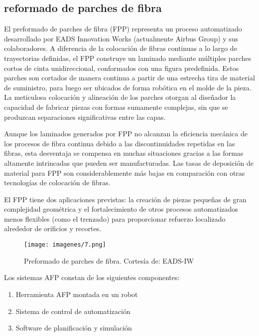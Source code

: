 \begin{enumerate}[label=\arabic*.]
\subsection{reformado de parches de fibra}

El preformado de parches de fibra (FPP) representa un proceso automatizado desarrollado por EADS Innovation Works (actualmente Airbus Group) y sus colaboradores. A diferencia de la colocación de fibras continuas a lo largo de trayectorias definidas, el FPP construye un laminado mediante múltiples parches cortos de cinta unidireccional, conformados con una figura predefinida. Estos parches son cortados de manera continua a partir de una estrecha tira de material de suministro, para luego ser ubicados de forma robótica en el molde de la pieza. La meticulosa colocación y alineación de los parches otorgan al diseñador la capacidad de fabricar piezas con formas sumamente complejas, sin que se produzcan separaciones significativas entre las capas.

Aunque los laminados generados por FPP no alcanzan la eficiencia mecánica de los procesos de fibra continua debido a las discontinuidades repetidas en las fibras, esta desventaja se compensa en muchas situaciones gracias a las formas altamente intrincadas que pueden ser manufacturadas. Las tasas de deposición de material para FPP son considerablemente más bajas en comparación con otras tecnologías de colocación de fibras.

El FPP tiene dos aplicaciones previstas: la creación de piezas pequeñas de gran complejidad geométrica y el fortalecimiento de otros procesos automatizados menos flexibles (como el trenzado) para proporcionar refuerzo localizado alrededor de orificios y recortes.

\begin{figure}[h]
    \centering
    \texttt{[image: imagenes/7.png]}
    \caption{Preformado de parches de fibra. Cortesía de: EADS-IW}
    \label{fig:enter-label}
\end{figure}


Los sistemas AFP constan de los siguientes componentes:

\begin{enumerate}
    \item Herramienta AFP montada en un robot
    \item Sistema de control de automatización
    \item Software de planificación y simulación
\end{enumerate}


\end{enumerate}
